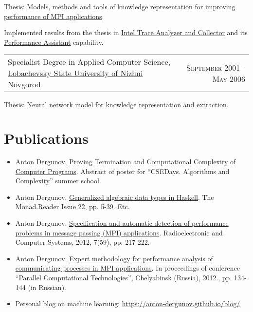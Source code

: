 \documentclass{article}
\makeatletter
\newcommand{\whatwherewhen}[3]{
\noindent\begin{tabular*}{\columnwidth}{@{}@{\extracolsep{\fill}}lr@{}}
#1, #2 & \textsc{#3}
\end{tabular*}}
\newcommand{\smallvskip}{\vskip2mm}
\makeatother
\begin{document}
Thesis: \href{https://search.rsl.ru/ru/record/01005013870}{Models, methods and tools of knowledge representation for improving performance of MPI applications}. 

Implemented results from the thesis in \href{http://software.intel.com/en-us/intel-trace-analyzer}{Intel Trace Analyzer and Collector} and its \href{https://web.archive.org/web/20151022144828/https://software.intel.com/en-us/node/561522}{Performance Assistant} capability.

\smallvskip
\whatwherewhen{Specialist Degree in Applied Computer Science}{\href{http://unn.ru}{Lobachevsky State University of Nizhni Novgorod}}{September 2001 - May 2006}

Thesis: Neural network model for knowledge representation and extraction.


\section{Publications}

\begin{itemize}
\item Anton Dergunov. \href{http://anton-dergunov.ru/publications/proving_complexity_v2.pdf}{Proving Termination and Computational Complexity of Computer Programs}. Abstract of poster for ``CSEDays. Algorithms and Complexity'' summer school.
\item Anton Dergunov. \href{http://themonadreader.files.wordpress.com/2013/08/issue221.pdf}{Generalized algebraic data types in Haskell}. The Monad.Reader Issue 22, pp. 5-39. Etc.
\item Anton Dergunov. \href{http://anton-dergunov.ru/publications/mpi_performance.pdf}{Specification and automatic detection of performance problems in message passing (MPI) applications}. Radioelectronic and Computer Systems, 2012, 7(59), pp. 217-222.
\item Anton Dergunov. \href{http://pavt.susu.ru/2012/full/159.pdf}{Expert methodology for performance analysis of communicating processes in MPI applications}. In proceedings of conference ``Parallel Computational Technologies'', Chelyabinsk (Russia), 2012., pp. 134-144 (in Russian).
\item Personal blog on machine learning: \href{https://anton-dergunov.github.io/blog/}{https://anton-dergunov.github.io/blog/}

\end{itemize}
\end{document}
